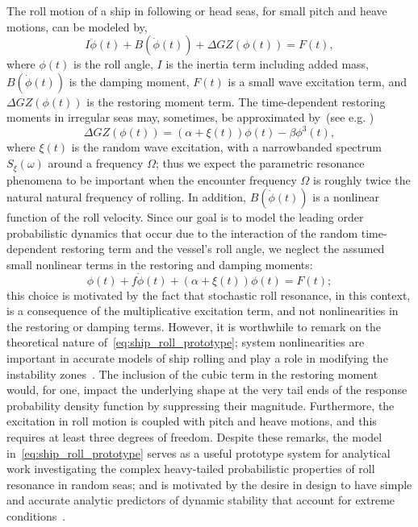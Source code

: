 \documentclass[3p]{elsarticle}
\begin{document}
The roll motion   of a ship in following or head seas, for small pitch and heave motions, can be modeled by, 
\begin{equation}
I \ddot \phi(t) + B(\dot \phi(t)) + \Delta GZ(\phi(t)) = F(t),
\end{equation}
where $\phi(t)$ is the roll angle,  $I$ is the inertia term including added mass,  $B(\dot \phi(t))$ is the damping moment, $F(t)$ is a small wave excitation term, and $\Delta GZ(\phi(t))$ is the restoring moment term. The time-dependent restoring moments in irregular seas may, sometimes, be approximated by~(see e.g. \cite{belenky07,Kreuzer})
\begin{equation}
\Delta GZ(\phi(t)) = (\alpha + \xi(t))\phi(t) - \beta \phi^3(t),
\end{equation}
where $\xi(t)$ is the random wave excitation,  with a narrowbanded spectrum $S_\xi(\omega)$ around a frequency  $\Omega$; thus we expect the parametric resonance phenomena to be important when the encounter frequency $\Omega$ is roughly twice the natural  natural frequency of rolling.  In addition, $B(\dot\phi(t))$ is    a nonlinear function of the roll   velocity. Since our goal  is to model the leading order probabilistic dynamics that occur due to the interaction of the random  time-dependent restoring  term  and the vessel's roll angle, we  neglect the assumed small nonlinear terms in the restoring   and damping moments:
\begin{equation}\label{eq:ship_roll_prototype}
  \phi(t) + f \dot\phi(t)  +(\alpha + \xi(t))\phi(t)  = F(t);
\end{equation}
this choice is motivated by the fact that stochastic roll resonance, in this context, is a consequence of the multiplicative excitation term,  and not nonlinearities in the restoring or damping terms.  However, it is worthwhile to remark on  the theoretical nature of~\cref{eq:ship_roll_prototype}; system nonlinearities are important  in   accurate models of ship rolling and play a role in modifying the instability zones~\cite{Neves20071618}. The inclusion of the cubic term in the  restoring moment would, for one,    impact the underlying shape at  the very tail ends  of the response  probability density function  by suppressing their magnitude. Furthermore,  the excitation in roll motion is  coupled   with pitch and heave motions, and this requires at least three degrees of freedom. Despite these remarks, the model in~\cref{eq:ship_roll_prototype} serves as a useful prototype system for analytical work  investigating  the complex heavy-tailed   probabilistic properties of  roll resonance in random seas; and is motivated by the desire in design to have simple and accurate  analytic predictors of dynamic stability  that  account for   extreme conditions~\cite{Sprou2000}. 
\end{document}
